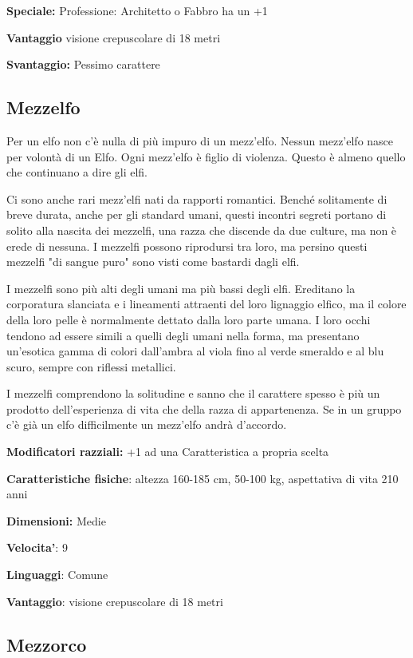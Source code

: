 \documentclass[a4paper,11pt,twoside,openany]{book}
\begin{document}
\textbf{Speciale:} Professione: Architetto o Fabbro ha un +1

\textbf{Vantaggio} visione crepuscolare di 18 metri

\textbf{Svantaggio:} Pessimo carattere

\subsection{Mezzelfo}

\label{mezzelfo}

Per un elfo non c'è nulla di più impuro di un mezz'elfo. Nessun mezz'elfo nasce per volontà di un Elfo. Ogni mezz'elfo è figlio di violenza. Questo è almeno quello che continuano a dire gli elfi.

Ci sono anche rari mezz'elfi nati da rapporti romantici. Benché solitamente di breve durata, anche per gli standard umani, questi incontri segreti portano di solito alla nascita dei mezzelfi, una razza che discende da due culture, ma non è erede di nessuna. I mezzelfi possono riprodursi tra loro, ma persino questi mezzelfi "di sangue puro" sono visti come bastardi dagli elfi.

I mezzelfi sono più alti degli umani ma più bassi degli elfi. Ereditano la corporatura slanciata e i lineamenti attraenti del loro lignaggio elfico, ma il colore della loro pelle è normalmente dettato dalla loro parte umana. I loro occhi tendono ad essere simili a quelli degli umani nella forma, ma presentano un'esotica gamma di colori dall'ambra al viola fino al verde smeraldo e al blu scuro, sempre con riflessi metallici.

I mezzelfi comprendono la solitudine e sanno che il carattere spesso è più un prodotto dell'esperienza di vita che della razza di appartenenza. Se in un gruppo c'è già un elfo difficilmente un mezz'elfo andrà d'accordo.

\textbf{Modificatori razziali:} +1 ad una Caratteristica a propria
scelta

\textbf{Caratteristiche fisiche}: altezza 160-185 cm, 50-100 kg, aspettativa di vita 210 anni

\textbf{Dimensioni:} Medie

\textbf{Velocita'}: 9

\textbf{Linguaggi}: Comune

\textbf{Vantaggio}: visione crepuscolare di 18 metri


\subsection{Mezzorco}
\end{document}
